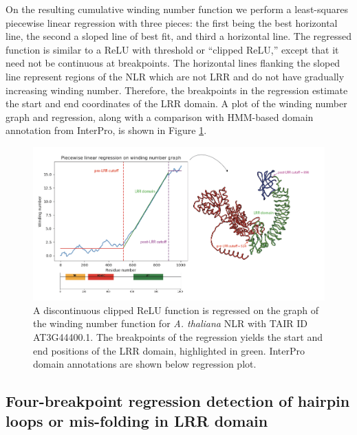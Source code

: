 \documentclass[authoryear]{article}
\begin{document}
On the resulting cumulative winding number function we perform a least-squares piecewise linear regression with three pieces: the first being the best horizontal line, the second a sloped line of best fit, and third a horizontal line. The regressed function is similar to a ReLU with threshold or ``clipped ReLU,'' except that it need not be continuous at breakpoints. The horizontal lines flanking the sloped line represent regions of the NLR which are not LRR and do not have gradually increasing winding number. Therefore, the breakpoints in the regression estimate the start and end coordinates of the LRR domain. A plot of the winding number graph and regression, along with a comparison with HMM-based domain annotation from InterPro, is shown in Figure \ref{fig:linreg}.

\begin{figure}[h!]
 \centering
 \includegraphics[width=1.0\textwidth]{piecewise.png}
 \caption{A discontinuous clipped ReLU function is regressed on the graph of the winding number function for \emph{A. thaliana} NLR with TAIR \cite{berardini2015arabidopsis} ID AT3G44400.1. The breakpoints of the regression yields the start and end positions of the LRR domain, highlighted in green. InterPro \cite{blum2021interpro} domain annotations are shown below regression plot.}
 \label{fig:linreg}
\end{figure}

\subsection*{Four-breakpoint regression detection of hairpin loops or mis-folding in LRR domain}
\end{document}
